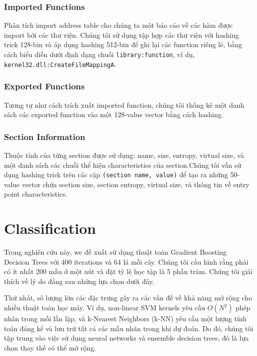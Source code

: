 \subsubsection{Imported Functions}
\label{sssec:imported}

Phân tích import address table cho chúng ta một báo cáo về các hàm được import bởi các thư viện.
Chúng tôi sử dụng tập hợp các thư viện với hashing trick 128-bin và áp dụng hashing 512-bin để ghi lại các function riêng lẻ, bằng cách biểu diễn dưới định dạng chuỗi \verb|library:function|, ví dụ, \verb|kernel32.dll:CreateFileMappingA|.

\subsubsection{Exported Functions}

Tương tự như cách trích xuất imported function, chúng tôi thống kê một danh sách các exported function vào một 128-value vector bằng cách hashing.

\subsubsection{Section Information}

Thuộc tính của từng section được sử dụng: name, size, entropy, virtual size, và một danh sách các chuỗi thể hiện characteristics của section.Chúng tôi vẫn sử dụng hashing trick trên các cặp \verb|(section name, value)| để tạo ra những 50-value vector chứa section size, section entropy, virtual size, và thông tin về entry point characteristics.

\section{Classification}
 
Trong nghiên cứu này, we đề xuất sử dụng thuật toán Gradient Boosting Decision Trees với 400 iterations và 64 lá mỗi cây. Chúng tôi cấu hình rằng phải có ít nhất 200 mẫu ở một nút và đặt tỷ lệ học tập là 5 phần trăm. Chúng tôi giải thích về lý do đằng sau những lựa chọn dưới đây.

Thứ nhất, số lượng lớn các đặc trưng gây ra các vấn đề về khả năng mở rộng cho nhiều thuật toán học máy. Ví dụ, non-linear SVM kernels yêu cầu $O(N^2)$ phép nhân trong mỗi lần lặp, và k-Nearest Neighbors (k-NN) yêu cầu một lượng tính toán đáng kể và lưu trữ tất cả các mẫu nhãn trong khi dự đoán. Do đó, chúng tôi tập trung vào việc sử dụng neural networks và ensemble decision trees, đó là lựa chọn thay thế có thể mở rộng.

